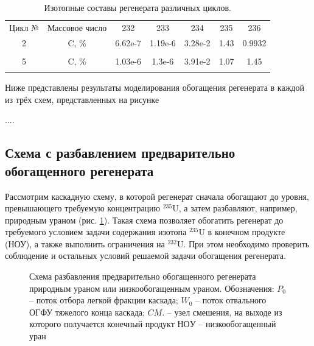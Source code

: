 \begin{table}[h]
  \centering
  \normalsize\begin{tabulary}{1.0\textwidth}{CCCCCCC}
  Цикл № & Массовое число & 232 & 233 & 234 & 235 & 236 \\
  2 & C, \% & 6.62e-7 & 1.19e-6 &    3.28e-2 & 1.43 & 0.9932 \\
   &  &  &  &  &  &  \\
  5 & C, \% &  1.03e-6 &   1.3e-6 &  3.91e-2 & 1.07 & 1.45 \\
   &  &  &  &  &  &  \\
  \end{tabulary}
  \caption{{Изотопные составы регенерата различных циклов.{\label{is_compositions_2_5}}}}
\end{table}


Ниже представлены результаты моделирования обогащения регенерата в каждой из трёх схем, представленных на рисунке 

.... 


\subsection{Схема с разбавлением предварительно обогащенного регенерата}

Рассмотрим каскадную схему, в которой регенерат сначала обогащают до уровня, превышающего требуемую концентрацию $^{235}$U, а затем разбавляют, например, природным ураном (рис. \ref{o1}). Такая схема позволяет обогатить регенерат до требуемого условием задачи содержания изотопа $^{235}$U в конечном продукте (НОУ), а также выполнить ограничения на $^{232}$U. При этом необходимо проверить соблюдение и остальных условий решаемой задачи обогащения регенерата.

\begin{figure}[ht]
  \caption{Схема разбавления предварительно обогащенного регенерата природным ураном или низкообогащенным ураном. Обозначения: $P_0$ -- поток отбора легкой фракции каскада; $W_0$ -- поток отвального ОГФУ тяжелого конца каскада; $CM.$ -- узел смешения, на выходе из которого получается конечный продукт $НОУ$ -- низкообогащенный уран}\label{o1}
\end{figure}

